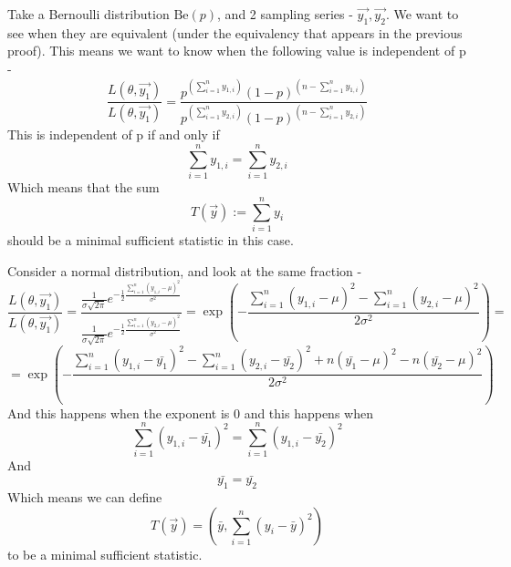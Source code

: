 \documentclass[../main.tex]{subfiles}
\begin{document}
\begin{example} Take a Bernoulli distribution $\text{Be}(p)$, and 2 sampling series - $\overrightarrow{y_1},\overrightarrow{y_2}$. We want to see when they are equivalent (under the equivalency that appears in the previous proof). This means we want to know when the following value is independent of p - \[\frac{L(\theta,\overrightarrow{y_1})}{L(\theta,\overrightarrow{y_1})} = \frac{p^{(\sum_{i=1}^n y_{1,i})}(1-p)^{(n - \sum_{i=1}^n y_{1,i})}}{p^{(\sum_{i=1}^n y_{2,i})}(1-p)^{(n - \sum_{i=1}^n y_{2,i})}}\]
This is independent of p if and only if \[\sum_{i=1}^n y_{1,i} = \sum_{i=1}^n y_{2,i}\]
Which means that the sum \[T(\overrightarrow{y}):=\sum_{i=1}^n y_i\]
should be a minimal sufficient statistic in this case. \end{example}
\begin{example}
Consider a normal distribution, and look at the same fraction - \[\frac{L(\theta,\overrightarrow{y_1})}{L(\theta,\overrightarrow{y_1})} = \frac{\frac{1}{\sigma\sqrt{2\pi}}e^{-\frac{1}{2}\frac{\sum_{i=1}^n (y_{1,i}-\mu)^2}{\sigma^2}}}{\frac{1}{\sigma\sqrt{2\pi}}e^{-\frac{1}{2}\frac{\sum_{i=1}^n (y_{2,i}-\mu)^2}{\sigma^2}}} = \exp\left(-\frac{\sum_{i=1}^n(y_{1,i}-\mu)^2 - \sum_{i=1}^n(y_{2,i}-\mu)^2}{2\sigma^2}\right)=\]\[=\exp\left(-\frac{\sum_{i=1}^n(y_{1,i}-\bar{y_1})^2 - \sum_{i=1}^n(y_{2,i}-\bar{y_2})^2 + n(\bar{y_1}-\mu)^2 - n(\bar{y_2}-\mu)^2} {2\sigma^2}\right)\]
And this happens when the exponent is 0 and this happens when
\[\sum_{i=1}^n(y_{1,i}-\bar{y_1})^2 = \sum_{i=1}^n(y_{1,i}-\bar{y_2})^2 \]
And 
\[\bar{y_1} = \bar{y_2}\]
Which means we can define \[T(\overrightarrow{y}) = \left(\bar{y}, \sum_{i=1}^n (y_i-\bar{y})^2\right)\]
to be a minimal sufficient statistic. \end{example}
\newpage
\end{document}
